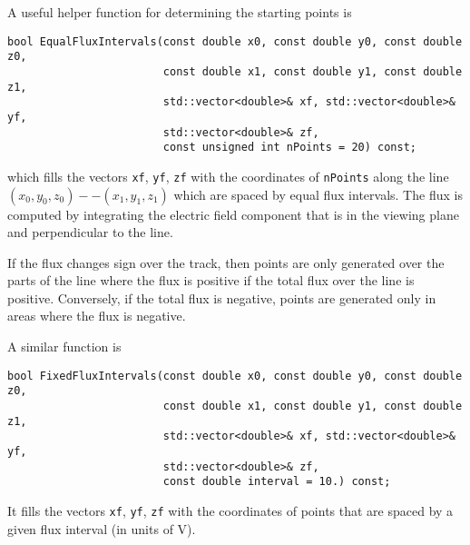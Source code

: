 A useful helper function for determining the starting points is
\begin{lstlisting}
bool EqualFluxIntervals(const double x0, const double y0, const double z0,
                        const double x1, const double y1, const double z1,
                        std::vector<double>& xf, std::vector<double>& yf,
                        std::vector<double>& zf,
                        const unsigned int nPoints = 20) const;
\end{lstlisting} 
which fills the vectors \texttt{xf}, \texttt{yf}, \texttt{zf} with 
the coordinates of \texttt{nPoints} along the line 
$\left(x_{0}, y_{0}, z_{0}\right) -- \left(x_{1}, y_{1}, z_{1}\right)$ 
which are spaced by equal flux intervals.
The flux is computed by integrating the electric field component 
that is in the viewing plane and perpendicular to the line.

If the flux changes sign over the track, then points are only generated 
over the parts of the line where the flux is positive if the total flux 
over the line is positive. 
Conversely, if the total flux is negative, points are generated only in 
areas where the flux is negative. 

A similar function is
\begin{lstlisting}
bool FixedFluxIntervals(const double x0, const double y0, const double z0,
                        const double x1, const double y1, const double z1,
                        std::vector<double>& xf, std::vector<double>& yf,
                        std::vector<double>& zf,
                        const double interval = 10.) const;
\end{lstlisting}
It fills the vectors \texttt{xf}, \texttt{yf}, \texttt{zf} with 
the coordinates of points that are spaced by a given flux interval 
(in units of V).

